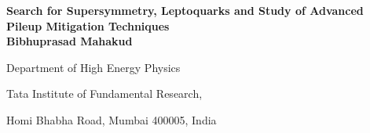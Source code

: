 \begin{titlepage}

\newcommand{\HRule}{\rule{\linewidth}{0.5mm}} %

\center %
 




{ \huge \bfseries Search for Supersymmetry, Leptoquarks and Study of Advanced Pileup Mitigation Techniques}\\[0.4cm] %
 
\vspace{1cm}
{\bf Bibhuprasad Mahakud}


\vspace{0.5cm}
Department of High Energy Physics

Tata Institute of Fundamental Research,

Homi Bhabha Road, Mumbai 400005, India



\end{titlepage}

